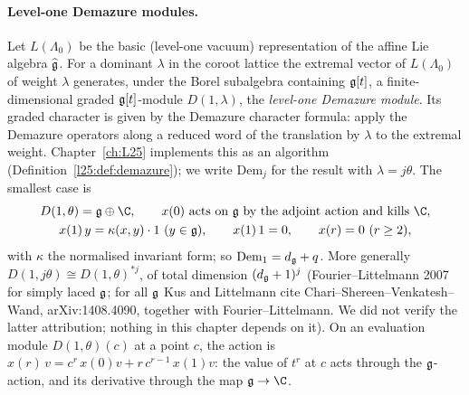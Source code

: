 \paragraph{Level-one Demazure modules.} Let $L(\Lambda_0)$ be the basic (level-one vacuum) representation of the affine
Lie algebra $\widehat{\mathfrak g}$. For a dominant $\lambda$ in the coroot lattice the extremal vector of
$L(\Lambda_0)$ of weight $\lambda$ generates, under the Borel subalgebra containing $\mathfrak g[t]$, a
finite-dimensional graded $\mathfrak g[t]$-module $D(1,\lambda)$, the \emph{level-one Demazure module}. Its graded
character is given by the Demazure character formula: apply the Demazure operators along a reduced word of the
translation by $\lambda$ to the extremal weight. Chapter~\ref{ch:L25} implements this as an algorithm
(Definition~\ref{l25:def:demazure}); we write $\mathrm{Dem}_j$ for the result with $\lambda=j\theta$. The smallest case is
\begin{gather*}
D(1,\theta)=\ltwentyseveng\oplus\C,\qquad x(0)\ \text{acts on }\ltwentyseveng\text{ by the adjoint action and kills }\C,\\
x(1)\,y=\kappa(x,y)\cdot1\ (y\in\ltwentyseveng),\qquad x(1)\,1=0,\qquad x(r)=0\ (r\ge2),
\end{gather*}
with $\kappa$ the normalised invariant form; so $\mathrm{Dem}_1=d_{\mathfrak g}+q$. More generally
$D(1,j\theta)\cong D(1,\theta)^{*j}$, of total dimension $(d_{\mathfrak g}+1)^j$ (Fourier--Littelmann 2007 for simply laced
$\mathfrak g$; for all $\mathfrak g$ Kus and Littelmann cite Chari--Shereen--Venkatesh--Wand, arXiv:1408.4090, together
with Fourier--Littelmann. We did not verify the latter attribution; nothing in this chapter depends on it). On an evaluation
module $D(1,\theta)(c)$ at a point $c$, the action is $x(r)\,v=c^r\,x(0)v+r\,c^{r-1}\,x(1)v$: the value of $t^r$ at $c$ acts
through the $\mathfrak g$-action, and its derivative through the map $\ltwentyseveng\to\C$.


